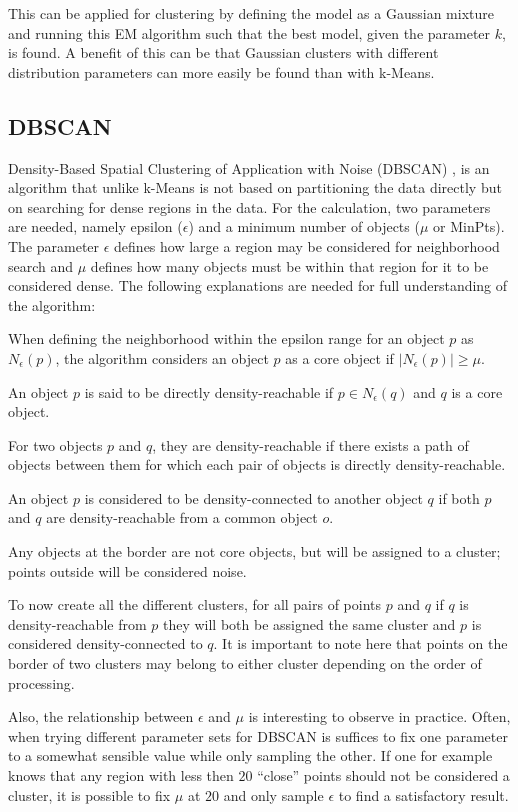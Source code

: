 \documentclass[
	a4paper,
	english,
	twoside,
	openright,               
	11pt                            
	]{report}
\begin{document}
This can be applied for clustering by defining the model as a Gaussian mixture and running this EM algorithm such that the best model, given the parameter $k$, is found. A benefit of this can be that Gaussian clusters with different distribution parameters can more easily be found than with k-Means.

\subsection{DBSCAN}
Density-Based Spatial Clustering of Application with Noise (DBSCAN) \cite{10.5555/3001460.3001507}, is an algorithm that unlike k-Means is not based on partitioning the data directly but on searching for dense regions in the data. For the calculation, two parameters are needed, namely epsilon ($\epsilon$) and a minimum number of objects ($\mu$ or MinPts). The parameter $\epsilon$ defines how large a region may be considered for neighborhood search and $\mu$ defines how many objects must be within that region for it to be considered dense. The following explanations are needed for full understanding of the algorithm:
\newline

When defining the neighborhood within the epsilon range for an object $p$ as $N_\epsilon(p)$, the algorithm considers an object $p$ as a core object if $|N_\epsilon(p)|\geq \mu$.

An object $p$ is said to be directly density-reachable if $p\in N_\epsilon(q) $ and $q$ is a core object.

For two objects $p$ and $q$, they are density-reachable if there exists a path of objects between them for which each pair of objects is directly density-reachable.

An object $p$ is considered to be density-connected to another object $q$ if both $p$ and $q$ are density-reachable from a common object $o$.

Any objects at the border are not core objects, but will be assigned to a cluster; points outside will be considered noise.
\newline

To now create all the different clusters, for all pairs of points $p$ and $q$ if $q$ is density-reachable from $p$ they will both be assigned the same cluster and $p$ is considered density-connected to $q$. It is important to note here that points on the border of two clusters may belong to either cluster depending on the order of processing.

Also, the relationship between $\epsilon$ and $\mu$ is interesting to observe in practice. Often, when trying different parameter sets for DBSCAN is suffices to fix one parameter to a somewhat sensible value while only sampling the other. If one for example knows that any region with less then $20$ ``close'' points should not be considered a cluster, it is possible to fix $\mu$ at $20$ and only sample $\epsilon$ to find a satisfactory result.
\end{document}
